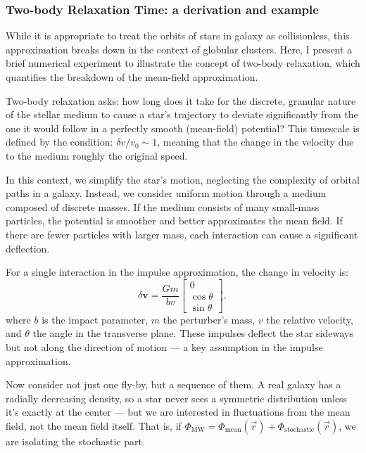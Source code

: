         \subsubsection{Two-body Relaxation Time: a derivation and example} \label{sec:twoBodyRelaxation}
            While it is appropriate to treat the orbits of stars in galaxy as collisionless, this approximation breaks down in the context of globular clusters. Here, I present a brief numerical experiment to illustrate the concept of two-body relaxation, which quantifies the breakdown of the mean-field approximation.

            Two-body relaxation asks: how long does it take for the discrete, granular nature of the stellar medium to cause a star's trajectory to deviate significantly from the one it would follow in a perfectly smooth (mean-field) potential? This timescale is defined by the condition: $\delta v / v_0 \sim 1$, meaning that the change in the velocity due to the medium roughly the original speed.

            In this context, we simplify the star's motion, neglecting the complexity of orbital paths in a galaxy. Instead, we consider uniform motion through a medium composed of discrete masses. If the medium consists of many small-mass particles, the potential is smoother and better approximates the mean field. If there are fewer particles with larger mass, each interaction can cause a significant deflection.

            For a single interaction in the impulse approximation, the change in velocity is:
            \begin{equation}
                \delta \mathbf{v} = \frac{Gm}{bv} \begin{bmatrix} 0 \\ \cos\theta \\ \sin\theta \end{bmatrix},
                \label{eq:delta_v_vec_impulse_approx}
            \end{equation}
            where $b$ is the impact parameter, $m$ the perturber's mass, $v$ the relative velocity, and $\theta$ the angle in the transverse plane. These impulses deflect the star sideways but not along the direction of motion — a key assumption in the impulse approximation.

            Now consider not just one fly-by, but a sequence of them. A real galaxy has a radially decreasing density, so a star never sees a symmetric distribution unless it's exactly at the center — but we are interested in fluctuations from the mean field, not the mean field itself. That is, if $\Phi_\mathrm{MW} = \Phi_\mathrm{mean}(\vec{r}) + \Phi_\mathrm{stochastic}(\vec{r})$, we are isolating the stochastic part.

